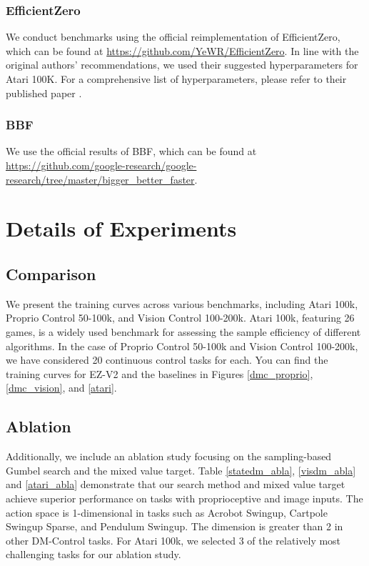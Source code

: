 \subsubsection{EfficientZero}
We conduct benchmarks using the official reimplementation of EfficientZero, which can be found at \href{https://github.com/YeWR/EfficientZero}{https://github.com/YeWR/EfficientZero}. In line with the original authors' recommendations, we used their suggested hyperparameters for Atari 100K. For a comprehensive list of hyperparameters, please refer to their published paper \citep{ye2021mastering}.

\subsubsection{BBF}
We use the official results of BBF, which can be found at \href{https://github.com/google-research/google-research/tree/master/bigger\_better\_faster}{https://github.com/google-research/google-research/tree/master/bigger\_better\_faster}.


\section{Details of Experiments}
\label{train_curves}

\subsection{Comparison}
\label{compare}
We present the training curves across various benchmarks, including Atari 100k, Proprio Control 50-100k, and Vision Control 100-200k. Atari 100k, featuring 26 games, is a widely used benchmark for assessing the sample efficiency of different algorithms. In the case of Proprio Control 50-100k and Vision Control 100-200k, we have considered 20 continuous control tasks for each. You can find the training curves for EZ-V2 and the baselines in Figures \ref{dmc_proprio}, \ref{dmc_vision}, and \ref{atari}.

\subsection{Ablation}
\label{ablation}

Additionally, we include an ablation study focusing on the sampling-based Gumbel search and the mixed value target. Table \ref{statedm_abla}, \ref{visdm_abla} and \ref{atari_abla} demonstrate that our search method and mixed value target achieve superior performance on tasks with proprioceptive and image inputs. 
The action space is 1-dimensional in tasks such as Acrobot Swingup, Cartpole Swingup Sparse, and Pendulum Swingup. The dimension is greater than 2 in other DM-Control tasks. For Atari 100k, we selected 3 of the relatively most challenging tasks for our ablation study.

